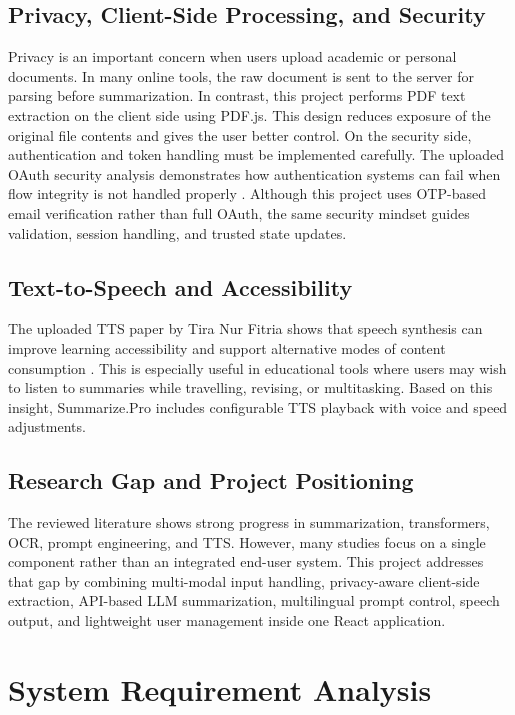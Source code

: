 \documentclass[12pt, a4paper]{report}
\begin{document}
\section{Privacy, Client-Side Processing, and Security}
Privacy is an important concern when users upload academic or personal documents. In many online tools, the raw document is sent to the server for parsing before summarization. In contrast, this project performs PDF text extraction on the client side using PDF.js. This design reduces exposure of the original file contents and gives the user better control. On the security side, authentication and token handling must be implemented carefully. The uploaded OAuth security analysis demonstrates how authentication systems can fail when flow integrity is not handled properly \cite{oauth}. Although this project uses OTP-based email verification rather than full OAuth, the same security mindset guides validation, session handling, and trusted state updates.

\section{Text-to-Speech and Accessibility}
The uploaded TTS paper by Tira Nur Fitria shows that speech synthesis can improve learning accessibility and support alternative modes of content consumption \cite{tts}. This is especially useful in educational tools where users may wish to listen to summaries while travelling, revising, or multitasking. Based on this insight, Summarize.Pro includes configurable TTS playback with voice and speed adjustments.

\section{Research Gap and Project Positioning}
The reviewed literature shows strong progress in summarization, transformers, OCR, prompt engineering, and TTS. However, many studies focus on a single component rather than an integrated end-user system. This project addresses that gap by combining multi-modal input handling, privacy-aware client-side extraction, API-based LLM summarization, multilingual prompt control, speech output, and lightweight user management inside one React application.

\chapter{System Requirement Analysis}
\end{document}

